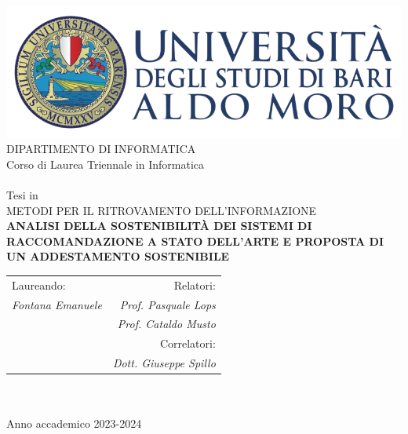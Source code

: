 \begin{titlepage}
    \begin{center}
        \includegraphics[scale=0.5]{images/uniba-logo.png}\\
        \vspace{0.5cm}
        {\large DIPARTIMENTO DI INFORMATICA}\\
        \vspace{0.5cm}
        {\large Corso di Laurea Triennale in Informatica}\\
        \hrulefill \\
        \vspace{0.5cm}
        {\large Tesi in}\\
        \vspace{0.5cm}
        {\large METODI PER IL RITROVAMENTO DELL'INFORMAZIONE}\\
        \vspace{0.5cm}
        {\LARGE \textbf{ANALISI DELLA SOSTENIBILITÀ DEI SISTEMI DI RACCOMANDAZIONE A STATO DELL'ARTE E PROPOSTA DI UN ADDESTAMENTO SOSTENIBILE}}
        \\ %
        \vspace{0.5cm}

        \vfill
        \centering
        \begin{tabularx}{\textwidth}{@{}Xr@{}}
          {\large Laureando:} & {\large Relatori:} \\ 
          {\large \textit{Fontana Emanuele}} & {\large \textit{Prof. Pasquale Lops}} \\ 
          {} & {\large \textit{Prof. Cataldo Musto}} \\ 
          {}  & {\large Correlatori:} \\
          {}  & {\large \textit{Dott. Giuseppe Spillo}} \\ 
        \end{tabularx}
        \textcolor{white}{.} \\ 
        \vspace{0.5cm}
        \hrulefill \\
        {\large Anno accademico 2023-2024}
    \end{center}
\end{titlepage}